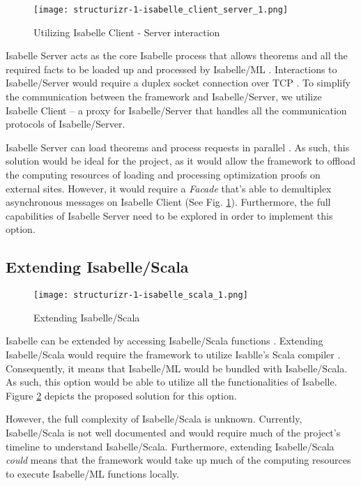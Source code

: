 \begin{figure}[h]
      \centering
      \texttt{[image: structurizr-1-isabelle\_client\_server\_1.png]}
      \caption{Utilizing Isabelle Client - Server interaction}
      \label{fig:IsabelleServer}
\end{figure}

Isabelle Server acts as the core Isabelle process that allows theorems and all the required facts to be loaded up and processed by Isabelle/ML
\cite[Ch. 4]{isabelleSystem}. Interactions to Isabelle/Server would require a duplex socket connection over TCP \cite[Ch. 4.2]{isabelleSystem}. 
To simplify the communication between the framework and Isabelle/Server, we utilize Isabelle Client \cite[Ch. 4.1.2]{isabelleSystem} -- a proxy 
for Isabelle/Server that handles all the communication protocols of Isabelle/Server.

Isabelle Server can load theorems and process requests in parallel \cite[Ch. 4.2.6]{isabelleSystem}. As such, this solution would be ideal 
for the project, as it would allow the framework to offload the computing resources of loading and processing optimization proofs on external sites.
However, it would require a \emph{Facade} that's able to demultiplex asynchronous messages on Isabelle Client (See Fig. \ref{fig:IsabelleServer}). 
Furthermore, the full capabilities of Isabelle Server need to be explored in order to implement this option.

\subsection{Extending Isabelle/Scala}
\label{sec:IsabelleScala}

\begin{figure}[h]
      \centering
      \texttt{[image: structurizr-1-isabelle\_scala\_1.png]}
      \caption{Extending Isabelle/Scala}
      \label{fig:IsabelleScala}
\end{figure}

Isabelle can be extended by accessing Isabelle/Scala functions \cite[Ch. 5]{isabelleSystem}. Extending Isabelle/Scala would require the framework 
to utilize Isablle's Scala compiler \cite[Ch. 5.1.4]{isabelleSystem}. Consequently, it means that Isabelle/ML would be bundled with Isabelle/Scala. 
As such, this option would be able to utilize all the functionalities of Isabelle. Figure \ref{fig:IsabelleScala} depicts the proposed solution for 
this option.

However, the full complexity of Isabelle/Scala is unknown. Currently, Isabelle/Scala is not well documented and would require much of the 
project's timeline to understand Isabelle/Scala. Furthermore, extending Isabelle/Scala \emph{could} means that the framework would take up 
much of the computing resources to execute Isabelle/ML functions locally.

